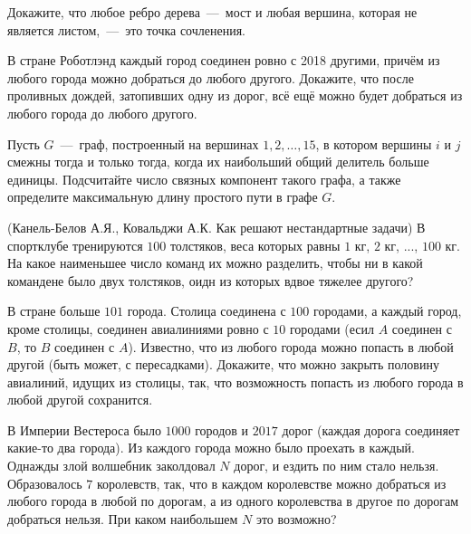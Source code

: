 \begin{exersize}
	Докажите, что любое ребро дерева~---~мост и любая вершина, которая не является листом,~---~это точка сочленения.
\end{exersize}

\begin{exersize}
	В стране Роботлэнд каждый город соединен ровно с 2018 другими, причём из любого города можно добраться до любого другого. Докажите, что после проливных дождей, затопивших одну из дорог, всё ещё можно будет добраться из любого города до любого другого.
\end{exersize}

\begin{exersize}
	Пусть $G$~---~граф, построенный на вершинах $1, 2, \dots, 15$, в котором вершины $i$ и $j$ смежны тогда и только тогда, когда их наибольший общий делитель больше единицы. Подсчитайте число связных компонент такого графа, а также определите максимальную длину простого пути в графе $G$.
\end{exersize}

\begin{exersize}(Канель-Белов А.Я., Ковальджи А.К. Как решают нестандартные задачи)
	В спортклубе тренируются $100$ толстяков, веса которых равны $1$ кг, $2$ кг, ..., $100$ кг. На какое наименьшее число команд их можно разделить, чтобы ни в какой командене было двух толстяков, оидн из которых вдвое тяжелее другого?
\end{exersize}

\begin{exersize}
	В стране больше $101$ города. Столица соединена с $100$ городами, а каждый город, кроме столицы, соединен авиалиниями ровно с $10$ городами (есил $A$ соединен с $B$, то $B$ соединен с $A$). Известно, что из любого города можно попасть в любой другой (быть может, с пересадками). Докажите, что можно закрыть половину авиалиний, идущих из столицы, так, что возможность попасть из любого города в любой другой сохранится.
\end{exersize}

\begin{exersize}
	В Империи Вестероса было $1000$ городов и $2017$ дорог (каждая дорога соединяет какие-то два города). Из каждого города можно было проехать в каждый. Однажды злой волшебник заколдовал $N$ дорог, и ездить по ним стало нельзя. Образовалось $7$ королевств, так, что в каждом королевстве можно добраться из любого города в любой по дорогам, а из одного королевства в другое по дорогам добраться нельзя. При каком наибольшем $N$ это возможно?
\end{exersize}

